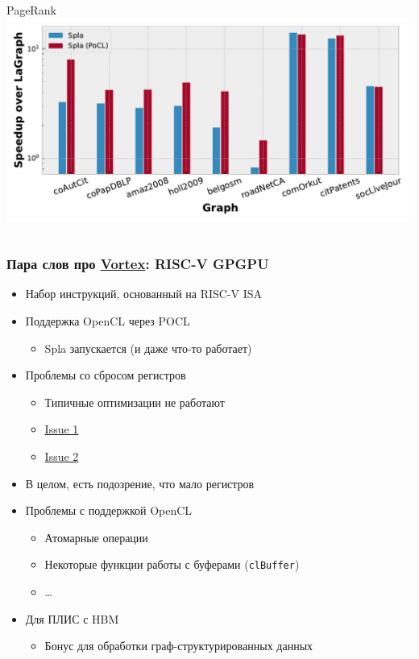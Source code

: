 \documentclass[xcolor=table,aspectratio=169]{beamer}
\begin{document}
\begin{frame}
\begin{columns}
\begin{center}
        PageRank\\
        \includegraphics[width=0.9\linewidth]{pictures/rq1_rel_pr.pdf}
        \end{center}
    \end{columns}
    
\end{frame}



\begin{frame}[fragile]
  \frametitle{Пара слов про \href{https://github.com/vortexgpgpu/vortex}{Vortex}: RISC-V GPGPU}
  \begin{itemize}
    \item Набор инструкций, основанный на RISC-V ISA
    \item Поддержка OpenCL через POCL 
    \begin{itemize}
      \item Spla запускается (и даже что-то работает)
    \end{itemize}
    \pause
    \item Проблемы со сбросом регистров
    \begin{itemize}
      \item Типичные оптимизации не работают
      \item \href{https://github.com/vortexgpgpu/vortex/issues/251}{Issue 1}
      \item \href{https://github.com/vortexgpgpu/vortex/issues/205}{Issue 2}
    \end{itemize}
    \item В целом, есть подозрение, что мало регистров
    \item Проблемы с поддержкой OpenCL
    \begin{itemize}
      \item Атомарные операции 
      \item Некоторые функции работы с буферами (\texttt{clBuffer})
      \item \ldots
    \end{itemize}
    \item Для ПЛИС с HBM
    \begin{itemize}
      \item[\faQuestion] Бонус для обработки граф-структурированных данных
    \end{itemize}
    
  \end{itemize}
\end{frame}
\end{document}
